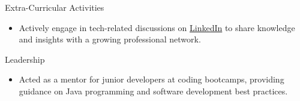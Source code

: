 \documentclass{resume} %
\begin{document}
\begin{rSection}{Extra-Curricular Activities} 
\begin{itemize}
    \item  Actively engage in tech-related discussions on \href{https://www.linkedin.com/in/maciejkasik}{LinkedIn} to share knowledge and insights with a growing professional network.
\end{itemize}


\end{rSection}

\begin{rSection}{Leadership} 
\begin{itemize}
    \item Acted as a mentor for junior developers at coding bootcamps, providing guidance on Java programming and software development best practices.
\end{itemize}

\end{rSection}
\end{document}
